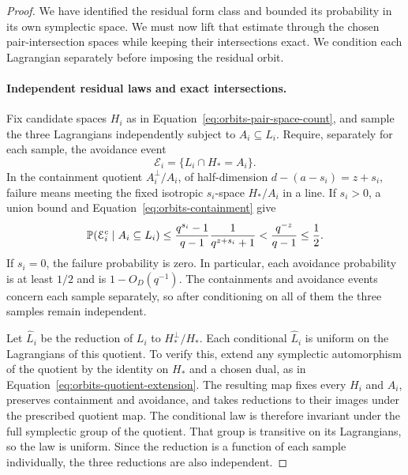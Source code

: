 \begin{proof}
We have identified the residual form class and bounded its probability
in its own symplectic space. We must now lift that estimate through
the chosen pair-intersection spaces while keeping their intersections
exact. We condition each Lagrangian separately before imposing the
residual orbit.

\paragraph{Independent residual laws and exact intersections.}
Fix candidate spaces $H_i$ as in
Equation~\eqref{eq:orbits-pair-space-count}, and sample the three
Lagrangians independently subject to $A_i\subseteq L_i$.
Require, separately for each sample, the avoidance event
\begin{equation}
 \mathcal E_i=\{L_i\cap H_*=A_i\}.
 \label{eq:orbits-avoidance}
\end{equation}
In the containment quotient $A_i^\perp/A_i$, of half-dimension
$d-(a-s_i)=z+s_i$, failure means meeting the fixed isotropic
$s_i$-space $H_*/A_i$ in a line.  If $s_i>0$, a union bound and
Equation~\eqref{eq:orbits-containment} give
\begin{equation}
 \P(\mathcal E_i^c\mid A_i\subseteq L_i)
 \le \frac{q^{s_i}-1}{q-1}\frac1{q^{z+s_i}+1}
 <\frac{q^{-z}}{q-1}\le\frac12.
 \label{eq:orbits-avoidance-probability}
\end{equation}
If $s_i=0$, the failure probability is zero.  In particular, each
avoidance probability is at least $1/2$ and is $1-O_D(q^{-1})$.
The containments and avoidance events concern each sample separately,
so after conditioning on all of them the three samples remain
independent.

Let $\widehat L_i$ be the reduction of $L_i$ to $H_*^\perp/H_*$.
Each conditional $\widehat L_i$ is uniform on the Lagrangians of this
quotient.  To verify this, extend any symplectic automorphism of the
quotient by the identity on $H_*$ and a chosen dual, as in
Equation~\eqref{eq:orbits-quotient-extension}.  The resulting map fixes
every $H_i$ and $A_i$, preserves containment and avoidance, and takes
reductions to their images under the prescribed quotient map.  The
conditional law is therefore invariant under the full symplectic
group of the quotient.  That group is transitive on its Lagrangians,
so the law is uniform.  Since the reduction is a function of each
sample individually, the three reductions are also independent.


\end{proof}
